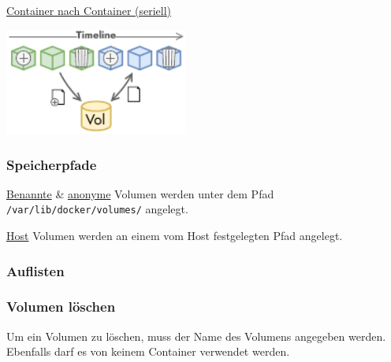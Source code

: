 \documentclass[
  10pt,
  a4paper,
  twocolumn]{article}
\newenvironment{Shaded}{}{}
\newcommand{\ExtensionTok}[1]{\textcolor[rgb]{0.84,0.23,0.29}{\textbf{#1}}}
\newcommand{\NormalTok}[1]{\textcolor[rgb]{0.14,0.16,0.18}{#1}}
\newcommand{\OperatorTok}[1]{\textcolor[rgb]{0.14,0.16,0.18}{#1}}
\newcommand*\circled[1]{\tikz[baseline=(char.base)]{
          \node[shape=circle,draw,inner sep=1pt] (char) {{\scriptsize#1}};}}
\begin{document}
\circled{3} \ul{Container nach Container (seriell)}

\begin{center}
\includegraphics[width=6cm,height=\textheight]{images/docker/volume_exchange_series.pdf}
\end{center}

\subsubsection{Speicherpfade}\label{speicherpfade}

\ul{Benannte} \& \ul{anonyme} Volumen werden unter dem Pfad
\texttt{/var/lib/docker/volumes/} angelegt.

\ul{Host} Volumen werden an einem vom Host festgelegten Pfad angelegt.

\subsubsection{\texorpdfstring{{\small \faTerminal\hspace{1mm}}
Auflisten}{ Auflisten}}\label{auflisten-2}

\begin{Shaded}
\end{Shaded}

\subsubsection{\texorpdfstring{{\small \faTerminal\hspace{1mm}} Volumen
löschen}{ Volumen löschen}}\label{volumen-luxf6schen}

Um ein Volumen zu löschen, muss der Name des Volumens angegeben werden.
Ebenfalls darf es von keinem Container verwendet werden.

\begin{Shaded}
\end{Shaded}
\end{document}
